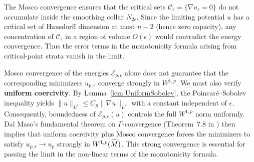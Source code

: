 \begin{remark}
The Mosco convergence ensures that the critical sets $\mathcal{C}_\epsilon = \{\nabla u_\epsilon = 0\}$ do not accumulate inside the smoothing collar $N_{2\epsilon}$. Since the limiting potential $u$ has a critical set of Hausdorff dimension at most $n-2$ (hence zero capacity), any concentration of $\mathcal{C}_\epsilon$ in a region of volume $O(\epsilon)$ would contradict the energy convergence. Thus the error terms in the monotonicity formula arising from critical-point strata vanish in the limit.
\end{remark}

\begin{remark}\label{rem:Coercivity}
Mosco convergence of the energies $\mathcal{E}_{p,\epsilon}$ alone does not guarantee that the corresponding minimizers $u_{p,\epsilon}$ converge strongly in $W^{1,p}$. We must also verify \textbf{uniform coercivity}. By Lemma~\ref{lem:UniformSobolev}, the Poincar\'e--Sobolev inequality yields $\|u\|_{L^p} \le C_S \|\nabla u\|_{L^p}$ with a constant independent of $\epsilon$. Consequently, boundedness of $\mathcal{E}_{p,\epsilon}(u)$ controls the full $W^{1,p}$ norm uniformly. Dal Maso's fundamental theorem on $\Gamma$-convergence (Theorem~7.8 in \cite{dalmaso1993}) then implies that uniform coercivity plus Mosco convergence forces the minimizers to satisfy $u_{p,\epsilon} \to u_p$ strongly in $W^{1,p}(\widetilde{M})$. This strong convergence is essential for passing the limit in the non-linear terms of the monotonicity formula.
\end{remark}

